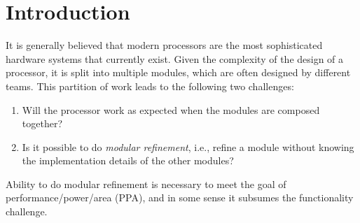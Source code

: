 \documentclass[conference]{IEEEtran}
\begin{document}
\section{Introduction}
It is generally believed that modern processors are the most sophisticated hardware systems that currently exist.
Given the complexity of the design of a processor, it is split into multiple modules, which are often designed by different teams.
This partition of work leads to the following two challenges:
\begin{enumerate}
    \item Will the processor work as expected when the modules are composed together?
    \item Is it possible to do \emph{modular refinement}, i.e., refine a module without knowing the implementation details of the other modules?
\end{enumerate}
Ability to do modular refinement is necessary to meet the goal of performance/power/area (PPA), and in some sense it subsumes the functionality challenge. 
\end{document}
